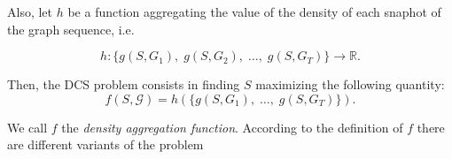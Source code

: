 Also, let $h$ be a function aggregating the value of the density of
each snaphot of the graph sequence, i.e.\

\begin{equation*}
	h: \{ g(S, G_1), \; g(S, G_2), \; \dots, \; g(S, G_T)\} \rightarrow
	\mathbb{R}.
\end{equation*}

Then, the \acrshort{DCS} problem consists in finding $S$ maximizing the
following quantity:
\begin{equation*}
	f(S, \mathcal{G} ) = h(\{g(S, G_1 ), \; \dots, \; g(S, G_T) \}).
\end{equation*}

We call $f$ the \emph{density aggregation function}. According to the
definition of $f$ there are different variants
of the problem

